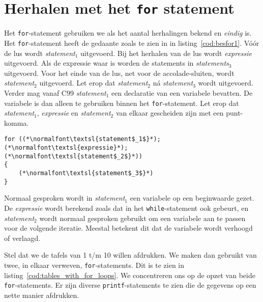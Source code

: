 %
%
%

\section{Herhalen met het \texttt{for} statement}
Het \texttt{for}-statement gebruiken we als het aantal herhalingen bekend en \textsl{eindig} is. Het \texttt{for}-statement heeft de gedaante zoals te zien in in listing~\ref{cod:besfor1}.
Vóór de lus wordt \textsl{statement}$_1$ uitgevoerd. Bij het herhalen van de lus wordt \textsl{expressie} uitgevoerd. Als de expressie waar is worden de statements in \textsl{statements$_3$} uitgevoerd. Voor het einde van de lus, net voor de accolade-sluiten, wordt \textsl{statement$_2$} uitgevoerd. Let erop dat  \textsl{statement$_2$} ná \textsl{statement$_3$} wordt uitgevoerd. Verder mag vanaf C99 \textsl{statement$_1$} een declaratie van een variabele bevatten. De variabele is dan alleen te gebruiken binnen het \texttt{for}-statement. Let erop dat  \textsl{statement$_1$}, \textsl{expressie} en \textsl{statement$_2$} van elkaar gescheiden zijn met een punt-komma.

\begin{lstlisting}[caption=Opzet van het \texttt{for}-statement.,label=cod:besfor1]
for ((*\normalfont\textsl{statement$_1$}*); (*\normalfont\textsl{expressie}*); (*\normalfont\textsl{statement$_2$}*))
{
    (*\normalfont\textsl{statement$_3$}*)
}
\end{lstlisting}

Normaal gesproken wordt in \textsl{statement$_1$} een variabele op een beginwaarde gezet. De \textsl{expressie} wordt berekend zoals dat in het \texttt{while}-statement ook gebeurt, en \textsl{statement$_2$} wordt normaal gesproken gebruikt om een variabele aan te passen voor de volgende iteratie. Meestal betekent dit dat de variabele wordt verhoogd of verlaagd.

Stel dat we de tafels van 1 t/m 10 willen afdrukken. We maken dan gebruikt van twee, in elkaar verweven, \texttt{for}-statements. Dit is te zien in listing~\ref{cod:tables_with_for_loops}. We concentreren ons op de opzet van beide \texttt{for}-statements. Er zijn diverse \texttt{printf}-statements te zien die de gegevens op een nette manier afdrukken.

